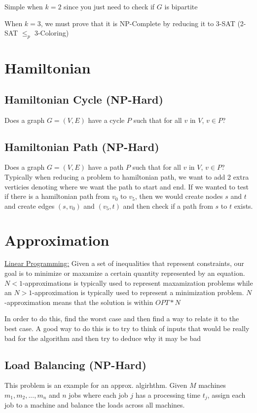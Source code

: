 \documentclass{article}
\begin{document}
Simple when $k=2$ since you just need to check if $G$ is bipartite

When $k=3$, we must prove that it is NP-Complete by reducing it to 3-SAT (2-SAT $\leq_p$ 3-Coloring)

\section{Hamiltonian}
\subsection{Hamiltonian Cycle (NP-Hard)}
Does a graph $G = (V, E)$ have a cycle $P$ such that for all $v$ in $V$, $v \in P$?

\subsection{Hamiltonian Path (NP-Hard)}
Does a graph $G = (V, E)$ have a path $P$ such that for all $v$ in $V$, $v \in P$?
Typically when reducing a problem to hamiltonian path, we want to add 2 extra verticies denoting
where we want the path to start and end. If we wanted to test if there is a hamiltonian path from 
$v_0$ to $v_5$, then we would create nodes $s$ and $t$ and create edges $(s, v_0)$ and $(v_5, t)$
and then check if a path from $s$ to $t$ exists.

\section{Approximation}
\underline{Linear Programming:} Given a set of inequalities that represent constraints, our
goal is to minimize or maxamize a certain quantity represented 
by an equation.
$N<1$-approximations is typically used to represent maxamization problems while
an $N>1$-approximation is typically used to represent a minimization problem. 
$N$-approximation means that the solution is within $OPT*N$

In order to do this, find the worst case and then find a way to relate it to the best case.
A good way to do this is to try to think of inputs that would be really bad for the algorithm
and then try to deduce why it may be bad

\subsection{Load Balancing (NP-Hard)}
This problem is an example for an approx. algirhthm. Given $M$ machines $m_1, m_2, ..., m_n$ and $n$ jobs where each job $j$ has a processing time
$t_j$, assign each job to a machine and balance the loads across all machines.
\end{document}
